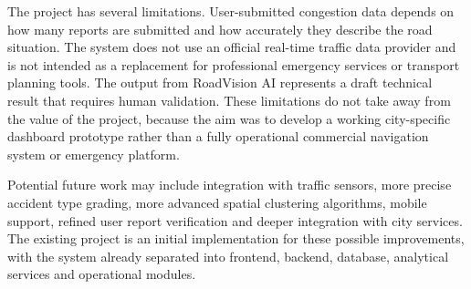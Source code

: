 ﻿\documentclass[12pt,a4paper]{report}
\begin{document}
The project has several limitations. User-submitted congestion data depends on how many reports are submitted and how accurately they describe the road situation. The system does not use an official real-time traffic data provider and is not intended as a replacement for professional emergency services or transport planning tools. The output from RoadVision AI represents a draft technical result that requires human validation. These limitations do not take away from the value of the project, because the aim was to develop a working city-specific dashboard prototype rather than a fully operational commercial navigation system or emergency platform.

Potential future work may include integration with traffic sensors, more precise accident type grading, more advanced spatial clustering algorithms, mobile support, refined user report verification and deeper integration with city services. The existing project is an initial implementation for these possible improvements, with the system already separated into frontend, backend, database, analytical services and operational modules.
\end{document}
